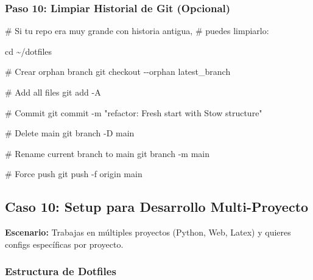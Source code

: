 \documentclass[
  doc,
  floatsintext,
  longtable,
  a4paper,
  nolmodern,
  notxfonts,
  notimes,
  12pt,
  colorlinks=true,linkcolor=blue,citecolor=blue,urlcolor=blue]{apa7}
\newenvironment{Shaded}{\begin{snugshade}}{\end{snugshade}}
\newcommand{\AttributeTok}[1]{\textcolor[rgb]{0.40,0.45,0.13}{#1}}
\newcommand{\BuiltInTok}[1]{\textcolor[rgb]{0.00,0.23,0.31}{#1}}
\newcommand{\CommentTok}[1]{\textcolor[rgb]{0.37,0.37,0.37}{#1}}
\newcommand{\FunctionTok}[1]{\textcolor[rgb]{0.28,0.35,0.67}{#1}}
\newcommand{\NormalTok}[1]{\textcolor[rgb]{0.00,0.23,0.31}{#1}}
\newcommand{\StringTok}[1]{\textcolor[rgb]{0.13,0.47,0.30}{#1}}
\begin{document}
\subsubsection{Paso 10: Limpiar Historial de Git
(Opcional)}\label{paso-10-limpiar-historial-de-git-opcional}

\begin{Shaded}
\begin{Highlighting}[]
\CommentTok{\# Si tu repo era muy grande con historia antigua,}
\CommentTok{\# puedes limpiarlo:}

\BuiltInTok{cd}\NormalTok{ \textasciitilde{}/dotfiles}

\CommentTok{\# Crear orphan branch}
\FunctionTok{git}\NormalTok{ checkout }\AttributeTok{{-}{-}orphan}\NormalTok{ latest\_branch}

\CommentTok{\# Add all files}
\FunctionTok{git}\NormalTok{ add }\AttributeTok{{-}A}

\CommentTok{\# Commit}
\FunctionTok{git}\NormalTok{ commit }\AttributeTok{{-}m} \StringTok{"refactor: Fresh start with Stow structure"}

\CommentTok{\# Delete main}
\FunctionTok{git}\NormalTok{ branch }\AttributeTok{{-}D}\NormalTok{ main}

\CommentTok{\# Rename current branch to main}
\FunctionTok{git}\NormalTok{ branch }\AttributeTok{{-}m}\NormalTok{ main}

\CommentTok{\# Force push}
\FunctionTok{git}\NormalTok{ push }\AttributeTok{{-}f}\NormalTok{ origin main}
\end{Highlighting}
\end{Shaded}

\subsection{Caso 10: Setup para Desarrollo
Multi-Proyecto}\label{caso-10-setup-para-desarrollo-multi-proyecto}

\textbf{Escenario:} Trabajas en múltiples proyectos (Python, Web, Latex)
y quieres configs específicas por proyecto.

\subsubsection{Estructura de Dotfiles}\label{estructura-de-dotfiles}
\end{document}
